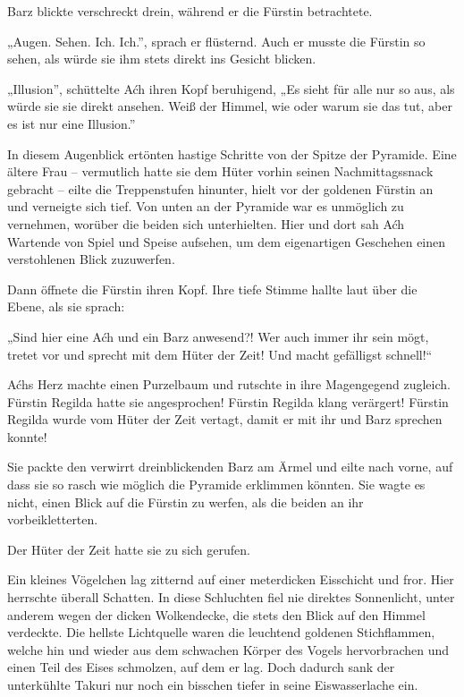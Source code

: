Barz blickte verschreckt drein, während er die Fürstin betrachtete.

„Augen. Sehen. Ich. Ich.”, sprach er flüsternd. Auch er musste die Fürstin so sehen, als würde sie ihm stets direkt ins Gesicht blicken.

„Illusion”, schüttelte Aćh ihren Kopf beruhigend, „Es sieht für alle nur so aus, als würde sie sie direkt ansehen. Weiß der Himmel, wie oder warum sie das tut, aber es ist nur eine Illusion.”

In diesem Augenblick ertönten hastige Schritte von der Spitze der Pyramide. Eine ältere Frau – vermutlich hatte sie dem Hüter vorhin seinen Nachmittagssnack gebracht – eilte die Treppenstufen hinunter, hielt vor der goldenen Fürstin an und verneigte sich tief. Von unten an der Pyramide war es unmöglich zu vernehmen, worüber die beiden sich unterhielten. Hier und dort sah Aćh Wartende von Spiel und Speise aufsehen, um dem eigenartigen Geschehen einen verstohlenen Blick zuzuwerfen.

Dann öffnete die Fürstin ihren Kopf. Ihre tiefe Stimme hallte laut über die Ebene, als sie sprach:

„Sind hier eine Aćh und ein Barz anwesend?! Wer auch immer ihr sein mögt, tretet vor und sprecht mit dem Hüter der Zeit! Und macht gefälligst schnell!“

Aćhs Herz machte einen Purzelbaum und rutschte in ihre Magengegend zugleich. Fürstin Regilda hatte sie angesprochen! Fürstin Regilda klang verärgert! Fürstin Regilda wurde vom Hüter der Zeit vertagt, damit er mit ihr und Barz sprechen konnte!

Sie packte den verwirrt dreinblickenden Barz am Ärmel und eilte nach vorne, auf dass sie so rasch wie möglich die Pyramide erklimmen könnten. Sie wagte es nicht, einen Blick auf die Fürstin zu werfen, als die beiden an ihr vorbeikletterten.

Der Hüter der Zeit hatte sie zu sich gerufen.



\trennzeichen



Ein kleines Vögelchen lag zitternd auf einer meterdicken Eisschicht und fror. Hier herrschte überall Schatten. In diese Schluchten fiel nie direktes Sonnenlicht, unter anderem wegen der dicken Wolkendecke, die stets den Blick auf den Himmel verdeckte. Die hellste Lichtquelle waren die leuchtend goldenen Stichflammen, welche hin und wieder aus dem schwachen Körper des Vogels hervorbrachen und einen Teil des Eises schmolzen, auf dem er lag. Doch dadurch sank der unterkühlte Takuri nur noch ein bisschen tiefer in seine Eiswasserlache ein.

